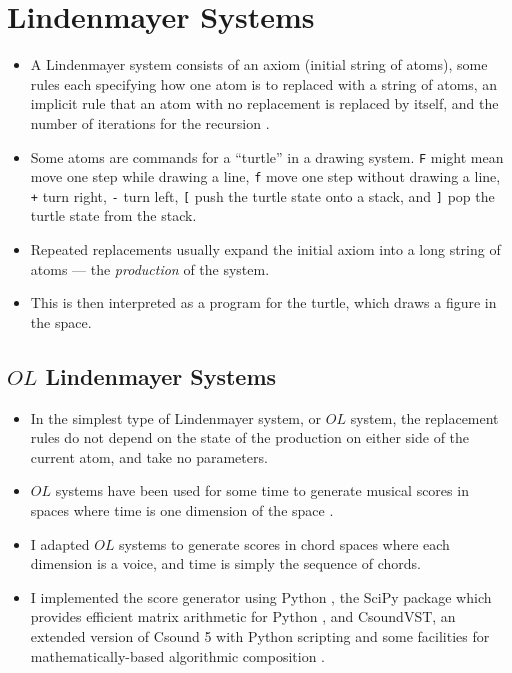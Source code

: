 \documentclass[14pt,letterpaper,onecolumn]{scrartcl}
\begin{document}
\section{Lindenmayer Systems}

\begin{itemize}

\item A Lindenmayer system consists of an axiom (initial string of atoms), some rules each specifying how one atom is to replaced with a string of atoms, an implicit rule that an atom with no replacement is replaced by itself, and the number of iterations for the recursion \cite{algorithmicbeautyofplants}. 

\item Some atoms are commands for a ``turtle'' in a drawing system. \texttt{F} might mean move one step while drawing a line, \texttt{f} move one step without drawing a line, \texttt{+} turn right, \texttt{-} turn left, \texttt{[} push the turtle state onto a stack, and \texttt{]} pop the turtle state from the stack. 

\item Repeated replacements usually expand the initial axiom into a long string of atoms --- the \emph{production} of the system. 

\item This is then interpreted as a program for the turtle, which draws a figure in the space. 

\end{itemize}

\subsection{$OL$ Lindenmayer Systems}

\begin{itemize}

\item In the simplest type of Lindenmayer system, or $OL$ system, the replacement rules do not depend on the state of the production on either side of the current atom, and take no parameters. 

\item $OL$ systems have been used for some time to generate musical scores in spaces where time is one dimension of the space \cite{usinggenerativegrammarsformusiccomposition,fractalmusicwithstringrewritinggrammars,grammarbasedmusiccomposition}.

\item I adapted $OL$ systems to generate scores in chord spaces where each dimension is a voice, and time is simply the sequence of chords. 

\item I implemented the score generator using Python \cite{python}, the SciPy package which provides efficient matrix arithmetic for Python \cite{scipy}, and CsoundVST, an extended version of Csound 5 with Python scripting and some facilities for mathematically-based algorithmic composition \cite{csoundmanual}.

\end{itemize}
\end{document}
